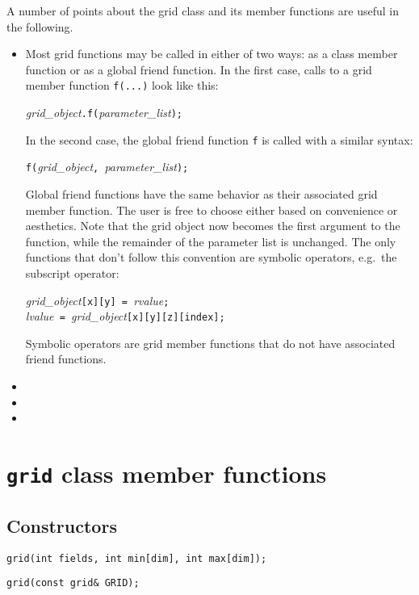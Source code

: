 A number of points about the grid class and its member functions are useful in the following.
\begin{itemize}
\item Most grid functions may be called in either of two ways: as a class member function or as a global friend function.  In the first case, calls to a grid member function {\tt f(...)} look like this:
\begin{center}
{\it grid\_object}{\tt .f(}{\it parameter\_list}{\tt );}
\end{center}
In the second case, the global friend function {\tt f} is called with a similar syntax:
\begin{center}
{\tt f(}{\it grid\_object}{\tt, }{\it parameter\_list}{\tt );}
\end{center}
Global friend functions have the same behavior as their associated grid member function.  The user is free to choose either based on convenience or aesthetics.  Note that the grid object now becomes the first argument to the function, while the remainder of the parameter list is unchanged.  The only functions that don't follow this convention are symbolic operators, e.g.\ the subscript operator: 
\begin{center}
{\it grid\_object}{\tt[x][y] = }{\it rvalue}{\tt;}\\
{\it lvalue}{\tt { }= }{\it grid\_object}{\tt[x][y][z][index];}
\end{center}
Symbolic operators are grid member functions that do not have associated friend functions.
\item 
\item 
\item 
\end{itemize}



\section{{\tt grid} class member functions}



\subsection{Constructors}


{\tt grid(int fields, int min[dim], int max[dim]);}

{\tt grid(const grid\& GRID);}

